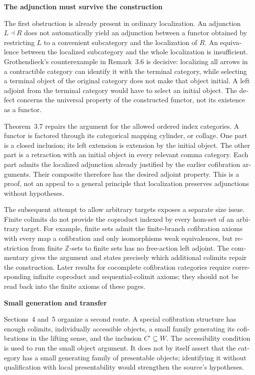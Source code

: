 \begin{otherlanguage}{english}
\medskip\noindent\textbf{The adjunction must survive the construction}

The first obstruction is already present in ordinary localization. An adjunction $L\dashv R$ does not automatically yield an adjunction between a functor obtained by restricting $L$ to a convenient subcategory and the localization of $R$. An equivalence between the localized subcategory and the whole localization is insufficient. Grothendieck's counterexample in Remark~3.6 is decisive: localizing all arrows in a contractible category can identify it with the terminal category, while selecting a terminal object of the original category does not make that object initial. A left adjoint from the terminal category would have to select an initial object. The defect concerns the universal property of the constructed functor, not its existence as a functor.

Theorem~3.7 repairs the argument for the allowed ordered index categories. A functor is factored through its categorical mapping cylinder, or collage. One part is a closed inclusion; its left extension is extension by the initial object. The other part is a retraction with an initial object in every relevant comma category. Each part admits the localized adjunction already justified by the earlier cofibration arguments. Their composite therefore has the desired adjoint property. This is a proof, not an appeal to a general principle that localization preserves adjunctions without hypotheses.

The subsequent attempt to allow arbitrary targets exposes a separate size issue. Finite colimits do not provide the coproduct indexed by every hom-set of an arbitrary target. For example, finite sets admit the finite-branch cofibration axioms with every map a cofibration and only isomorphisms weak equivalences, but restriction from finite $\mathbb Z$-sets to finite sets has no free-action left adjoint. The commentary gives the argument and states precisely which additional colimits repair the construction. Later results for cocomplete cofibration categories require corresponding infinite coproduct and sequential-colimit axioms; they should not be read back into the finite axioms of these pages.

\medskip\noindent\textbf{Small generation and transfer}

Sections~4 and~5 organize a second route. A special cofibration structure has enough colimits, individually accessible objects, a small family generating its cofibrations in the lifting sense, and the inclusion $C^{\square}\subseteq W$. The accessibility condition is used to run the small object argument. It does not by itself assert that the category has a small generating family of presentable objects; identifying it without qualification with local presentability would strengthen the source's hypotheses.


\end{otherlanguage}
